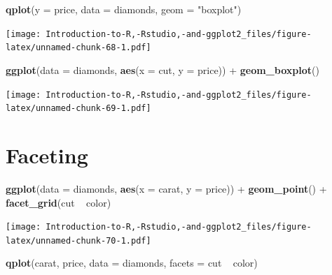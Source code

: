 \documentclass[]{book}
\newenvironment{Shaded}{\begin{snugshade}}{\end{snugshade}}
\newcommand{\KeywordTok}[1]{\textcolor[rgb]{0.13,0.29,0.53}{\textbf{{#1}}}}
\newcommand{\DataTypeTok}[1]{\textcolor[rgb]{0.13,0.29,0.53}{{#1}}}
\newcommand{\StringTok}[1]{\textcolor[rgb]{0.31,0.60,0.02}{{#1}}}
\newcommand{\NormalTok}[1]{{#1}}
\begin{document}
\begin{Shaded}
\begin{Highlighting}[]
\KeywordTok{qplot}\NormalTok{(}\DataTypeTok{y =} \NormalTok{price, }\DataTypeTok{data =} \NormalTok{diamonds, }\DataTypeTok{geom =} \StringTok{"boxplot"}\NormalTok{)}
\end{Highlighting}
\end{Shaded}

\texttt{[image: Introduction-to-R,-Rstudio,-and-ggplot2\_files/figure-latex/unnamed-chunk-68-1.pdf]}

\begin{Shaded}
\begin{Highlighting}[]
\KeywordTok{ggplot}\NormalTok{(}\DataTypeTok{data =} \NormalTok{diamonds, }\KeywordTok{aes}\NormalTok{(}\DataTypeTok{x =} \NormalTok{cut, }\DataTypeTok{y =} \NormalTok{price)) +}\StringTok{ }\KeywordTok{geom_boxplot}\NormalTok{() }
\end{Highlighting}
\end{Shaded}

\texttt{[image: Introduction-to-R,-Rstudio,-and-ggplot2\_files/figure-latex/unnamed-chunk-69-1.pdf]}

\section{Faceting}\label{faceting}

\begin{Shaded}
\begin{Highlighting}[]
\KeywordTok{ggplot}\NormalTok{(}\DataTypeTok{data =} \NormalTok{diamonds, }\KeywordTok{aes}\NormalTok{(}\DataTypeTok{x =} \NormalTok{carat, }\DataTypeTok{y =} \NormalTok{price)) +}\StringTok{ }\KeywordTok{geom_point}\NormalTok{() +}\StringTok{ }\KeywordTok{facet_grid}\NormalTok{(cut ~}\StringTok{ }\NormalTok{color)}
\end{Highlighting}
\end{Shaded}

\texttt{[image: Introduction-to-R,-Rstudio,-and-ggplot2\_files/figure-latex/unnamed-chunk-70-1.pdf]}

\begin{Shaded}
\begin{Highlighting}[]
\KeywordTok{qplot}\NormalTok{(carat, price, }\DataTypeTok{data =} \NormalTok{diamonds, }\DataTypeTok{facets =} \NormalTok{cut ~}\StringTok{ }\NormalTok{color)}
\end{Highlighting}
\end{Shaded}
\end{document}
